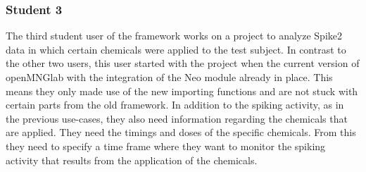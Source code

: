 \subsubsection{Student 3}

The third student user of the framework works on a project to analyze Spike2 data in which certain chemicals were applied to the test subject. In contrast to the other two users, this user started with the project when the current version of openMNGlab with the integration of the Neo module already in place. This means they only made use of the new importing functions and are not stuck with certain parts from the old framework. In addition to the spiking activity, as in the previous use-cases, they also need information regarding the chemicals that are applied. They need the timings and doses of the specific chemicals. From this they need to specify a time frame where they want to monitor the spiking activity that results from the application of the chemicals.\\

